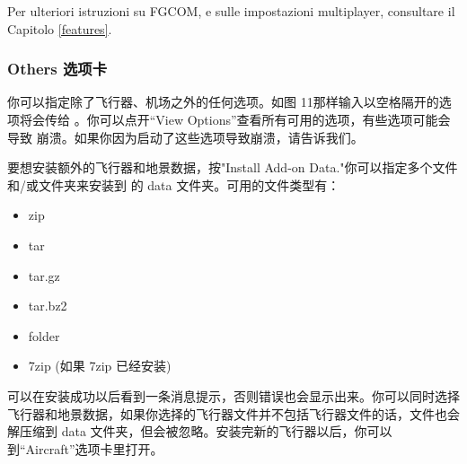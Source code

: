 \begin{itemize}
{Per ulteriori istruzioni su FGCOM, e sulle impostazioni multiplayer, consultare il Capitolo \ref{features}.
}{}

\ifchinese
\subsubsection{Others 选项卡}
你可以指定除了飞行器、机场之外的任何选项。如图 11那样输入以空格隔开的选项将会传给 \FlightGear{}。你可以点开“View Options”查看所有可用的选项，有些选项可能会导致 \FlightGear{} 崩溃。如果你因为启动了这些选项导致崩溃，请告诉我们。

要想安装额外的飞行器和地景数据，按"Install Add-on Data."你可以指定多个文件和/或文件夹来安装到 \FlightGear{} 的 data 文件夹。可用的文件类型有：
\begin{itemize}
\item zip
\item tar
\item tar.gz
\item tar.bz2
\item folder
\item 7zip (如果 7zip 已经安装)
\end{itemize}

可以在安装成功以后看到一条消息提示，否则错误也会显示出来。你可以同时选择飞行器和地景数据，如果你选择的飞行器文件并不包括飞行器文件的话，文件也会解压缩到 data 文件夹，但会被忽略。安装完新的飞行器以后，你可以到``Aircraft''选项卡里打开。
\fi
%
%
\end{itemize}
